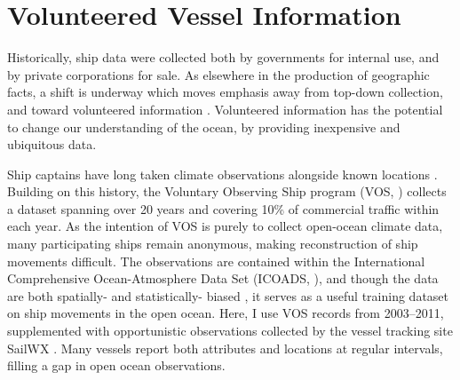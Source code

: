 \section{Volunteered Vessel Information}


Historically, ship data were collected both by governments for internal use, and by private corporations for sale. As elsewhere in the production of geographic facts, a shift is underway which moves emphasis away from top-down collection, and toward volunteered information \citep{goodchild2007citizens,elwood2011researching}. Volunteered information has the potential to change our understanding of the ocean, by providing inexpensive and ubiquitous data.

Ship captains have long taken climate observations alongside known locations \citep{brohan2009marine}.  Building on this history, the Voluntary Observing Ship program (VOS, \citealp{VOSOverview}) collects a dataset spanning over 20 years and covering 10\% of commercial traffic within each year. As the intention of VOS is purely to collect open-ocean climate data, many participating ships remain anonymous, making reconstruction of ship movements difficult.  The observations are contained within the International Comprehensive Ocean-Atmosphere Data Set (ICOADS, \citealp{woodruff2010icoads}), and though the data are both spatially- and statistically- biased \citep{Wang2007}, it serves as a useful training dataset on ship movements in the open ocean. Here, I use VOS records from 2003--2011, supplemented with opportunistic observations collected by the vessel tracking site SailWX \citep{SAILWX}. Many vessels report both attributes and locations at regular intervals, filling a gap in open ocean observations.

